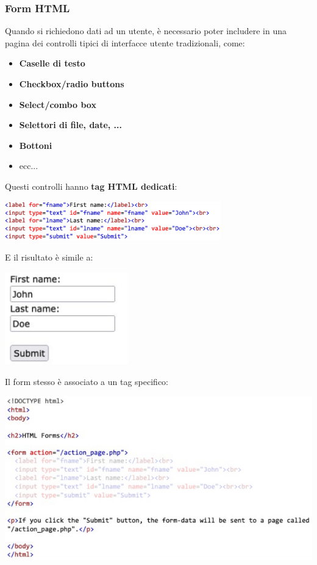\documentclass[12pt]{article}
\begin{document}
\subsubsection{Form HTML}
Quando si richiedono dati ad un utente, è necessario poter includere in una pagina dei controlli tipici di interfacce utente tradizionali, come:
\begin{itemize}
    \item \textbf{Caselle di testo}
    \item \textbf{Checkbox/radio buttons}
    \item \textbf{Select/combo box}
    \item \textbf{Selettori di file, date, ...}
    \item \textbf{Bottoni}
    \item ecc...
\end{itemize}
Questi controlli hanno \textbf{tag HTML dedicati}:
\begin{center}
    \includegraphics[width = 0.70\textwidth]{Images/164.PNG}
\end{center}
E il risultato è simile a:
\begin{center}
    \includegraphics[width = 0.40\textwidth]{Images/165.PNG}
\end{center}
\newpage
Il form stesso è associato a un tag specifico:
\begin{center}
    \includegraphics[width = 1\textwidth]{Images/166.PNG}
\end{center}
\end{document}
